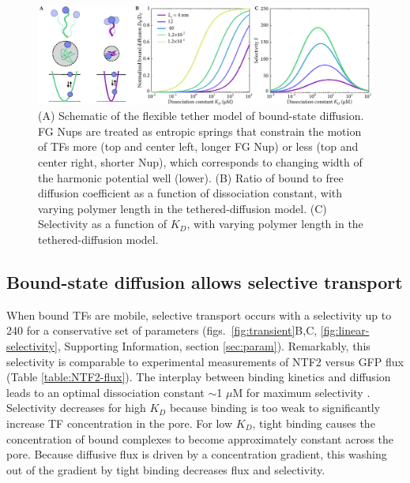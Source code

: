 \begin{figure}
\centering
\includegraphics[width=\textwidth]{figs/ch02/fig3.pdf}
\caption{(A) Schematic of the flexible tether model of bound-state
  diffusion. FG Nups are treated as entropic springs that constrain
  the motion of TFs more (top and center left, longer FG Nup) or less
  (top and center right, shorter Nup), which corresponds to changing
  width of the harmonic potential well (lower).  (B) Ratio of bound to
  free diffusion coefficient as a function of dissociation constant,
  with varying polymer length in the tethered-diffusion model.  (C)
  Selectivity as a function of $K_D$, with varying polymer length in
  the tethered-diffusion model.}
\label{fig:tethers}
\end{figure}


\subsection{Bound-state diffusion allows selective transport}
When bound TFs are mobile, selective transport occurs with a
selectivity up to 240 for a conservative set of parameters
(figs.~\ref{fig:transient}B,C, \ref{fig:linear-selectivity},
Supporting Information, section \ref{sec:param}).  Remarkably, this
selectivity is comparable to experimental measurements of NTF2 versus
GFP flux (Table \ref{table:NTF2-flux}).  The interplay between binding
kinetics and diffusion leads to an optimal dissociation constant
$\sim$1 $\mu$M for maximum selectivity .
Selectivity decreases for high $K_D$ because binding is too weak to
significantly increase TF concentration in the pore.  For low $K_D$,
tight binding causes the concentration of bound complexes to become
approximately constant across the pore. Because diffusive flux is
driven by a concentration gradient, this washing out of the gradient
by tight binding decreases flux and selectivity.

